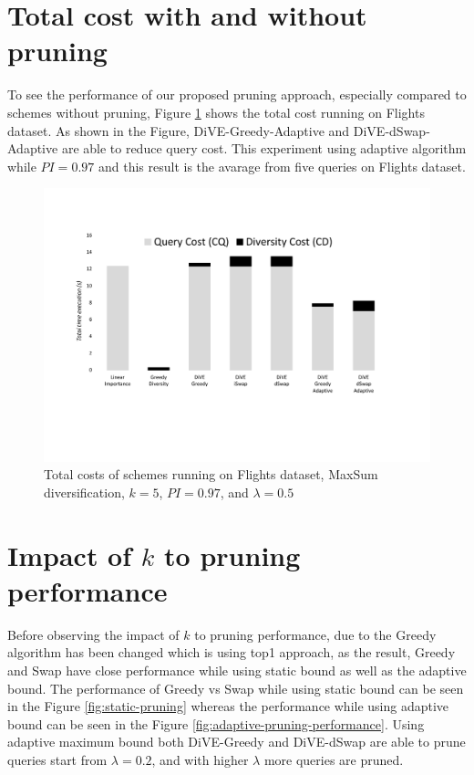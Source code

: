 \documentclass{article}
\begin{document}
\section{Total cost with and without pruning}
To see the performance of our proposed pruning approach, especially compared to schemes without pruning, Figure \ref{fig:flight_costs_all} shows the total cost running on Flights dataset. As shown in the Figure, DiVE-Greedy-Adaptive and DiVE-dSwap-Adaptive are able to reduce query cost. This experiment using adaptive algorithm while $ PI = 0.97 $ and this result is the avarage from five queries on Flights dataset. 

\begin{figure}
	\begin{center}
		\vspace{-50pt}
		\includegraphics[width=7.0in]{figures/flight_costs_all}
		\vspace{-90pt}
		\caption{Total costs of schemes running on Flights dataset, MaxSum diversification, $k = 5$,  $ PI = 0.97 $, and $\lambda = 0.5$ }
		\label{fig:flight_costs_all}
		\vspace{-20pt}
	\end{center}
\end{figure}

\section{Impact of $ k $ to pruning performance}

Before observing the impact of $k$ to pruning performance, due to the Greedy algorithm has been changed which is using top1 approach, as the result, Greedy and Swap have close performance while using static bound as well as the adaptive bound. The performance of Greedy vs Swap while using static bound can be seen in the Figure \ref{fig:static-pruning} whereas the performance while using adaptive bound can be seen in the Figure \ref{fig:adaptive-pruning-performance}. Using adaptive maximum bound both DiVE-Greedy and DiVE-dSwap are able to prune queries start from $\lambda = 0.2$, and with higher $\lambda$ more queries are pruned. 
\end{document}
